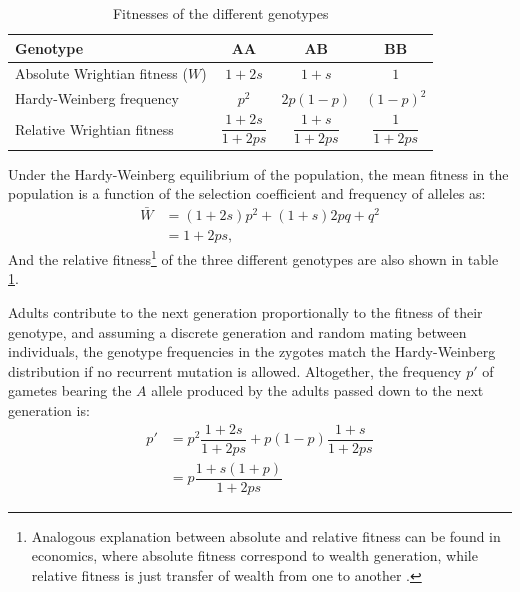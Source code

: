 \begin{table}[H]
	\centering
	\begin{tabular}{|l|ccc|}
		\hline
		\textbf{Genotype} & $\bm{AA}$ & $\bm{AB}$ & $\bm{BB}$ \\
		\hline\hline
		Absolute Wrightian fitness ($W$) & $1+2s$ & $1+s$ & $1$ \\
		\hline Hardy-Weinberg frequency & $p^2$ & $2p(1-p)$ & $(1-p)^2$ \\
		\hline Relative Wrightian fitness & $\dfrac{1+2s}{1+2ps}$ & $\dfrac{1+s}{1+2ps}$ & $\dfrac{1}{1+2ps}$ \\
		\hline
	\end{tabular}
	\caption[Fitnesses of the different genotypes]{Fitnesses of the different genotypes}\label{table:fitnesses}
\end{table}

Under the Hardy-Weinberg equilibrium of the population, the mean fitness in the population is a function of the selection coefficient and frequency of alleles as:
\begin{align}
\bar{W} &= (1+2s)p^2 + (1+s)2pq + q^2 \\
&= 1 + 2ps,
\end{align}
And the relative fitness\footnote{Analogous explanation between absolute and relative fitness can be found in economics, where absolute fitness correspond to wealth generation, while relative fitness is just transfer of wealth from one to another \citep{Masel2016}.} of the three different genotypes are also shown in table \ref{table:fitnesses}. 

Adults contribute to the next generation proportionally to the fitness of their genotype, and assuming a discrete generation and random mating between individuals, the genotype frequencies in the zygotes match the Hardy-Weinberg distribution if no recurrent mutation is allowed.
Altogether, the frequency $p'$ of gametes bearing the $A$ \gls{allele} produced by the adults passed down to the next generation is:
\begin{align}
p' & = p^2 \dfrac{1+2s}{1+2ps} + p(1-p)\dfrac{1+s}{1+2ps}\\
& = p\dfrac{1+s(1+p)}{1 + 2ps}
\end{align}

